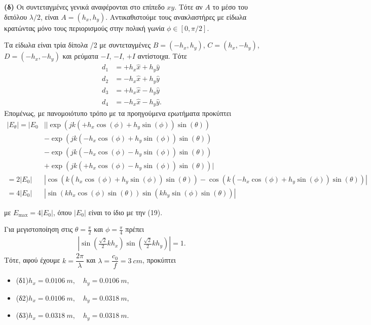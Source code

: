 \documentclass[12pt]{article}
\begin{document}
\textbf{(δ)} Οι συντεταγμένες γενικά αναφέρονται στο επίπεδο \(xy\). Τότε αν \(A \) το μέσο του διπόλου \(\lambda/2\), είναι \(A = (h_x, h_y)\). 
Αντικαθιστούμε τους ανακλαστήρες με είδωλα κρατώντας μόνο τους περιορισμούς στην πολική γωνία \(\phi \in [0, \pi/2]\). 

Τα είδωλα είναι τρία δίπολα \lambda/2 με συντεταγμένες \(B = (-h_x, h_y)\), \(C = (h_x, -h_y)\), \(D = (-h_x, -h_y)\) και ρεύματα \(-I\), \(-I\), \(+I\) αντίστοιχα. 
Tότε 
\begin{align}
    d_1 &= + h_x \hat{x} + h_y \hat{y} \\
    d_2 &= - h_x \hat{x} + h_y \hat{y} \\
    d_3 &= + h_x \hat{x} - h_y \hat{y} \\
    d_4 &= - h_x \hat{x} - h_y \hat{y}. 
\end{align}
Επομένως, με πανομοιότυπο τρόπο με τα προηγούμενα ερωτήματα προκύπτει
\begin{align*}
    |E_\theta| = |E_0&||\exp(jk(+h_x \cos(\phi)+h_y \sin(\phi)) \sin(\theta)) \\
    &- \exp(jk(-h_x \cos(\phi) + h_y \sin(\phi)) \sin(\theta)) \\
    &- \exp(jk(-h_x \cos(\phi) - h_y \sin(\phi)) \sin(\theta)) \\ 
    &+ \exp(jk(+h_x \cos(\phi) - h_y \sin(\phi)) \sin(\theta))| \\
    = 2|E_0|&|\cos(k(h_x \cos(\phi) + h_y \sin(\phi)) \sin(\theta)) - \cos(k(-h_x \cos(\phi) + h_y \sin(\phi)) \sin(\theta))| \\
    = 4|E_0|&|\sin(k h_x \cos(\phi)\sin(\theta)) \sin(k h_y \sin(\phi)\sin(\theta))| 
\end{align*}

με \(E_{\max} = 4|E_0|\), όπου \(|E_0|\) είναι το ίδιο με την (19).

Για μεγιστοποίηση στις \(\theta = \frac{\pi }{2 }\) και \(\phi = \frac{\pi }{4}\) πρέπει
\begin{align}
    \left|\sin\left(\frac{\sqrt{2 }}{2}kh_x\right)\sin\left(\frac{\sqrt{2 }}{2}kh_y\right)\right| = 1. 
\end{align}
Τότε, αφού έχουμε \(k = \dfrac{2\pi }{\lambda}\) και \(\lambda = \dfrac{c_0}{f} = \SI{3}{cm}\), προκύπτει 
\begin{itemize}
    \item (δ1)\quad \(h_x = \SI{0.0106}{m},\quad h_y = \SI{0.0106}{m}, \)
    \item (δ2)\quad \(h_x = \SI{0.0106}{m},\quad h_y = \SI{0.0318}{m}, \)
    \item (δ3)\quad \(h_x = \SI{0.0318}{m},\quad h_y = \SI{0.0318}{m}. \)
\end{itemize}
\end{document}
